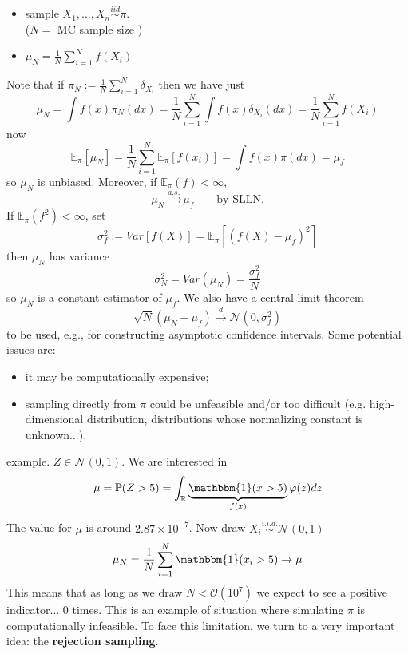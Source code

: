 \documentclass{article}
\begin{document}
\begin{algorithm}{}
\begin{itemize}
    \item sample $X_1, \dots, X_n \stackrel{iid}{\sim}\pi$. \\
    ($N=$ MC sample size )
    \item $\mu_N = \frac{1}{N} \sum_{i=1}^N f(X_i) $\\
    \end{itemize}
    \end{algorithm}
    Note that if $\pi_N:= \frac{1}{N} \sum_{i=1}^N \delta_{X_i}$ then we have just 
    \begin{equation*}
        \mu_N = \int f(x) \pi_N (dx) = \frac{1}{N} \sum_{i=1}^N\int f(x)\delta_{X_i}  (dx) = \frac{1}{N} \sum_{i=1}^N f(X_i)
    \end{equation*}
    now 
    \[
    \mathbb{E}_\pi\left[\mu_N\right]=\frac{1}{N}\sum_{i=1}^{N}\mathbb{E}_\pi\left[f(x_i)\right]=\int f(x)\pi(dx)=\mu_f
    \]
    so $\mu_N$ is unbiased. Moreover, if $\mathbb{E}_\pi(f)<\infty$,
    \[
    \mu_N\xrightarrow{a.s.}\mu_f\qquad\text{by SLLN.}
    \]
    If $\mathbb{E}_{\pi} (f^2) < \infty$, set 
    \begin{equation*}
        \sigma_f ^2 := Var [f(X)] = \mathbb{E}_{\pi} [(f(X)- \mu_f)^2]
    \end{equation*}
    then $\mu_N$ has variance 
    \begin{equation*}
         \sigma_N ^2= Var(\mu_N) = \frac{\sigma_f ^2}{N}
    \end{equation*}
    so $\mu_N$ is a constant estimator of $\mu_f$. We also have a central limit theorem
    \begin{equation*}
         \sqrt{N} (\mu_N-\mu_f) \xrightarrow{d} \mathcal{N}(0, \sigma_f ^2)
    \end{equation*}
    to be used, e.g., for constructing asymptotic confidence intervals. 
Some potential issues are:
\begin{itemize}
    \item it may be computationally expensive;
    \item sampling directly from $\pi$ could be unfeasible and/or too difficult (e.g. high-dimensional distribution, distributions whose normalizing constant is unknown...).
\end{itemize}
    example. $Z \in \mathcal{N}(0,1)$. We are interested in 
    \begin{equation*}
        \mu= \mathbb{P}(Z> 5) = \int _{\mathbb{R}}\underbrace{\mathbbm{1}(x >5)}_{\mathclap{f(x)}} \varphi (z) dz
    \end{equation*}
    The value for $\mu$ is around $2.87\times10^{-7}$. Now draw $X_i \stackrel{i.i.d.}{\sim} \mathcal{N}(0,1)$
    \begin{equation*}
        \mu_N = \frac{1}{N} \sum_{i=1}^N \mathbbm{1}(x_i >5) \rightarrow \mu
    \end{equation*}
    This means that as long as we draw $N<\mathcal{O}(10^7)$ we expect to see a positive indicator... 0 times. This is an example of situation where simulating $\pi$ is computationally infeasible. To face this limitation, we turn to a very important idea: the \textbf{rejection sampling}. 
\end{document}
